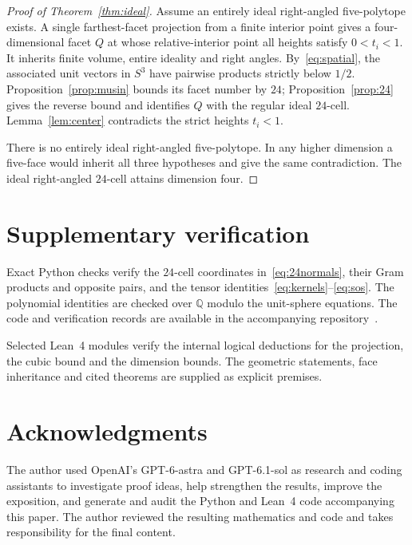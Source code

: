 \documentclass[11pt]{article}
\theoremstyle{remark}
\begin{document}
\begin{proof}[Proof of Theorem~\ref{thm:ideal}]
Assume an entirely ideal right-angled five-polytope exists. A single
farthest-facet projection from a finite interior point gives a
four-dimensional facet $Q$ at whose relative-interior point all heights satisfy
$0<t_i<1$. It inherits finite volume, entire ideality and right angles.
By~\eqref{eq:spatial}, the associated unit vectors in $S^3$ have
pairwise products strictly below $1/2$. Proposition~\ref{prop:musin}
bounds its facet number by $24$; Proposition~\ref{prop:24} gives the
reverse bound and identifies $Q$ with the regular ideal $24$-cell.
Lemma~\ref{lem:center} contradicts the strict heights $t_i<1$.

There is no entirely ideal right-angled five-polytope. In any higher
dimension a five-face would inherit all three hypotheses and give
the same contradiction. The ideal right-angled $24$-cell attains
dimension four.
\end{proof}

\FloatBarrier
\section{Supplementary verification}\label{sec:reproduce}

Exact Python checks verify the $24$-cell coordinates
in~\eqref{eq:24normals}, their Gram products and opposite pairs,
and the tensor identities~\eqref{eq:kernels}--\eqref{eq:sos}.
The polynomial identities are checked over $\mathbb Q$ modulo the
unit-sphere equations. The code and verification records are
available in the accompanying repository~\cite{Repository}.

Selected Lean~4 modules verify the internal logical deductions
for the projection, the cubic bound and the dimension bounds.
The geometric statements, face inheritance and cited theorems
are supplied as explicit premises.

\section*{Acknowledgments}
The author used OpenAI's GPT-6-astra and GPT-6.1-sol as research and coding
assistants to investigate proof ideas, help strengthen the results, improve
the exposition, and generate and audit the Python and Lean~4 code
accompanying this paper. The author reviewed the resulting mathematics
and code and takes responsibility for the final content.

\begingroup
\raggedright


\endgroup
\end{document}
